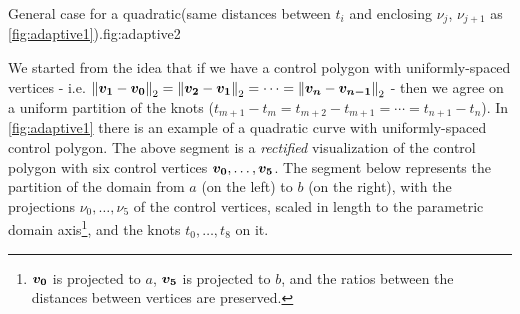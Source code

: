 \documentclass[dissertation.tex]{subfiles}
\begin{document}
\begin{myfig}{General case for a quadratic(same distances between
    $t_i$ and enclosing $\nu_j$, $\nu_{j+1}$ as \cref{fig:adaptive1}).}{fig:adaptive2}
\end{myfig}
We started from the idea that if we have a control polygon with
uniformly-spaced vertices -
i.e. $\left\lVert\boldsymbol{v_1}-\boldsymbol{v_0}\right\rVert_2=\left\lVert\boldsymbol{v_2}-\boldsymbol{v_1}\right\rVert_2=\cdots=\left\lVert\boldsymbol{v_n}-\boldsymbol{v_{n-1}}\right\rVert_2$
- then we agree on a uniform partition of the knots
($t_{m+1}-t_m=t_{m+2}-t_{m+1}=\cdots=t_{n+1}-t_n$). In
\cref{fig:adaptive1} there is an example of a quadratic \bs curve with
uniformly-spaced control polygon. The above segment is a
\emph{rectified} 
visualization of the control polygon with six control
vertices
$\boldsymbol{v_0},\dots,\boldsymbol{v_5}$. The segment below represents the
partition of the domain from $a$ (on the left) to $b$
(on the right), with the projections $\nu_0,\dots,\nu_5$ of the control
vertices,
scaled in length to the parametric domain axis\footnote{$\boldsymbol{v_0}$ is
  projected to $a$, $\boldsymbol{v_5}$ is projected to $b$, and the ratios
  between the distances between vertices are preserved.}, and the
knots $t_0,\dots,t_8$ on it.
\end{document}
